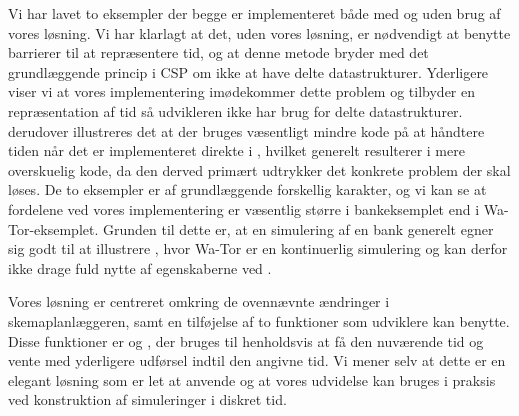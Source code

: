 Vi har lavet to eksempler der begge er implementeret både med og uden brug af vores \des løsning. Vi har klarlagt at det, uden vores \des løsning, er nødvendigt at benytte barrierer til at repræsentere tid, og at denne metode bryder med det grundlæggende princip i CSP om ikke at have delte datastrukturer. Yderligere viser vi at vores implementering imødekommer dette problem og tilbyder en repræsentation af tid så udvikleren ikke har brug for delte datastrukturer. derudover illustreres det at der bruges væsentligt mindre kode på at håndtere tiden når det er implementeret direkte i \pycsp, hvilket generelt resulterer i mere overskuelig kode, da den derved primært udtrykker det konkrete problem der skal løses. De to eksempler er af grundlæggende forskellig karakter, og vi kan se at fordelene ved vores \des implementering er væsentlig større i bankeksemplet end i Wa-Tor-eksemplet. Grunden til dette er, at en simulering af en bank generelt egner sig godt til at illustrere \des, hvor Wa-Tor er en kontinuerlig simulering og kan derfor ikke drage fuld nytte af egenskaberne ved \des. 

Vores løsning er centreret omkring de ovennævnte ændringer i skemaplanlæggeren, samt en tilføjelse af to funktioner som udviklere kan benytte. Disse funktioner er  og , der bruges til henholdsvis at få den nuværende tid og vente med yderligere udførsel indtil den angivne tid. Vi mener selv at dette er en elegant løsning som er let at anvende og at vores udvidelse kan bruges i praksis ved konstruktion af simuleringer i diskret tid. 

